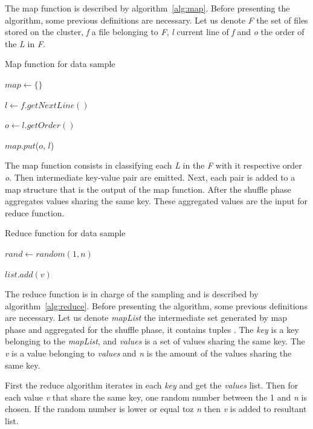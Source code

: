 The map function is described by algorithm~\ref{alg:map}. Before presenting the
algorithm, some previous definitions are necessary. Let us denote {\it F} the set
of files stored on the cluster, {\it f} a file belonging to {\it F}, {\it l} current
line of {\it f} and {\it o} the order of the {\it L} in {\it F}.

\begin{algorithm}
		\caption{Map function for data sample \label{alg:map}}


		$map \leftarrow  \{\}$

		 {

			$l \leftarrow f.getNextLine()$

	    	$o \leftarrow l.getOrder()$ 

			$map.put$($o$, $l$)

		}
		
\end{algorithm}


The map function consists in classifying each {\it L} in the {\it F} with
it respective order {\it o}. Then intermediate key-value pair 
are emitted. Next, each pair is added to a map structure that is the output of
the map function. After the shuffle phase aggregates values sharing the same key.
These aggregated values are the input for reduce function.

\begin{algorithm}
		\caption{Reduce function for data sample \label{alg:reduce}}


		 {

			 {
				$rand \leftarrow random(1, n)$

				 {
					$list.add(v)$
				}

			}

		}

\end{algorithm}

The reduce function is in charge of the sampling and is described by algorithm~\ref{alg:reduce}.
Before presenting the algorithm, some previous definitions are necessary. Let us
denote {\it mapList} the intermediate set generated by map phase and aggregated
for the shuffle phase, it contains tuples . The {\it key}
is a key belonging to the {\it mapList}, and {\it values} is a set of values sharing
the same key. The {\it v} is a value belonging to {\it values} and {\it n} is
the amount of the values sharing the same key.

First the reduce algorithm iterates in each {\it key} and get the {\it values}
list. Then for each value {\it v} that share the same key, one random number
between the 1 and {\it n} is chosen. If the random number is lower or equal toz
{\it n} then {\it v} is added to resultant list. 
